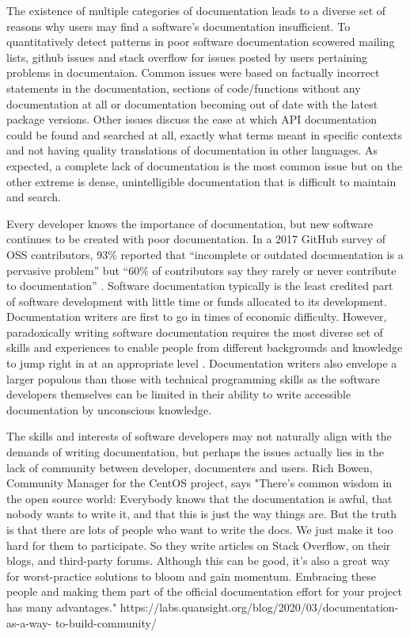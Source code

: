 \documentclass[../main.tex]{subfiles}
\begin{document}
The existence of multiple categories of documentation leads to a diverse set of reasons why users may find a software’s documentation insufficient.
To quantitatively detect patterns in poor software documentation \cite{Aghajani2019} scowered mailing lists, github issues and stack overflow for issues posted by users pertaining problems in documentaion. 
Common issues were based on factually incorrect statements in the documentation, sections of code/functions without any documentation at all or documentation becoming out of date with the latest package versions.
Other issues discuss the ease at which API documentation could be found and searched at all, exactly what terms meant in specific contexts and not having quality translations of documentation in other languages.
As expected, a complete lack of documentation is the most common issue but on the other extreme is dense, unintelligible documentation that is difficult to maintain and search.

Every developer knows the importance of documentation, but new software continues to be created with poor documentation.
In a 2017 GitHub survey of OSS contributors, 93\% reported that “incomplete or outdated documentation is a pervasive problem” but “60\% of contributors say they rarely or never contribute to documentation” \cite{Geiger2017}.
Software documentation typically is the least credited part of software development with little time or funds allocated to its development.
Documentation writers are first to go in times of economic difficulty. \cite{Forward2002}
However, paradoxically writing software documentation requires the most diverse set of skills and experiences to enable people from different backgrounds and knowledge to jump right in at an appropriate level \cite{Geiger2018}.
Documentation writers also envelope a larger populous than those with technical programming skills as the software developers themselves can be limited in their ability to write accessible documentation by unconscious knowledge.

The skills and interests of software developers may not naturally align with the demands of writing documentation, but perhaps the issues actually lies in the lack of community between developer, documenters and users.
Rich Bowen, Community Manager for the CentOS project,  says "There’s common wisdom in the open source world: Everybody knows that the documentation is awful, that nobody wants to write it, and that this is just the way things are. But the truth is that there are lots of people who want to write the docs. We just make it too hard for them to participate. So they write articles on Stack Overflow, on their blogs, and third-party forums. Although this can be good, it’s also a great way for worst-practice solutions to bloom and gain momentum. Embracing these people and making them part of the official documentation effort for your project has many advantages." https://labs.quansight.org/blog/2020/03/documentation-as-a-way- to-build-community/
\end{document}
